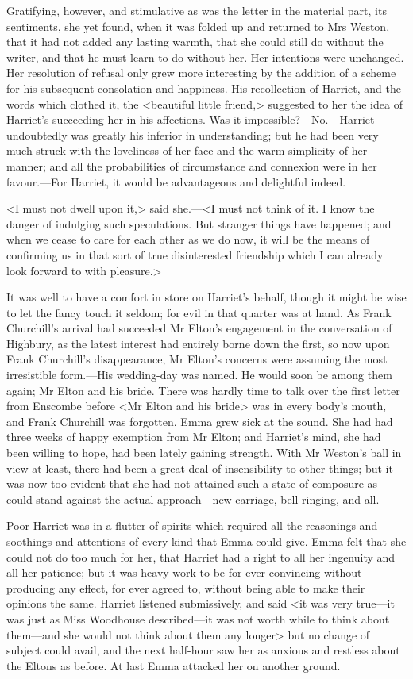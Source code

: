 Gratifying, however, and stimulative as was the letter in the material part, its sentiments, she yet found, when it was folded up and returned to Mrs Weston, that it had not added any lasting warmth, that she could still do without the writer, and that he must learn to do without her. Her intentions were unchanged. Her resolution of refusal only grew more interesting by the addition of a scheme for his subsequent consolation and happiness. His recollection of Harriet, and the words which clothed it, the <beautiful little friend,> suggested to her the idea of Harriet's succeeding her in his affections. Was it impossible?—No.—Harriet undoubtedly was greatly his inferior in understanding; but he had been very much struck with the loveliness of her face and the warm simplicity of her manner; and all the probabilities of circumstance and connexion were in her favour.—For Harriet, it would be advantageous and delightful indeed.

<I must not dwell upon it,> said she.—<I must not think of it. I know the danger of indulging such speculations. But stranger things have happened; and when we cease to care for each other as we do now, it will be the means of confirming us in that sort of true disinterested friendship which I can already look forward to with pleasure.>

It was well to have a comfort in store on Harriet's behalf, though it might be wise to let the fancy touch it seldom; for evil in that quarter was at hand. As Frank Churchill's arrival had succeeded Mr Elton's engagement in the conversation of Highbury, as the latest interest had entirely borne down the first, so now upon Frank Churchill's disappearance, Mr Elton's concerns were assuming the most irresistible form.—His wedding-day was named. He would soon be among them again; Mr Elton and his bride. There was hardly time to talk over the first letter from Enscombe before <Mr Elton and his bride> was in every body's mouth, and Frank Churchill was forgotten. Emma grew sick at the sound. She had had three weeks of happy exemption from Mr Elton; and Harriet's mind, she had been willing to hope, had been lately gaining strength. With Mr Weston's ball in view at least, there had been a great deal of insensibility to other things; but it was now too evident that she had not attained such a state of composure as could stand against the actual approach—new carriage, bell-ringing, and all.

Poor Harriet was in a flutter of spirits which required all the reasonings and soothings and attentions of every kind that Emma could give. Emma felt that she could not do too much for her, that Harriet had a right to all her ingenuity and all her patience; but it was heavy work to be for ever convincing without producing any effect, for ever agreed to, without being able to make their opinions the same. Harriet listened submissively, and said <it was very true—it was just as Miss Woodhouse described—it was not worth while to think about them—and she would not think about them any longer> but no change of subject could avail, and the next half-hour saw her as anxious and restless about the Eltons as before. At last Emma attacked her on another ground.

